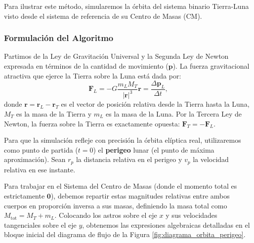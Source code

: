 \documentclass[11pt,a4paper]{book}
\begin{document}
Para ilustrar este método, simularemos la órbita del sistema binario Tierra-Luna visto desde el sistema de referencia de su Centro de Masas (CM).

\subsubsection{Formulación del Algoritmo}


Partimos de la Ley de Gravitación Universal y la Segunda Ley de Newton expresada en términos de la cantidad de movimiento ($\boldsymbol{p}$). La fuerza gravitacional atractiva que ejerce la Tierra sobre la Luna está dada por:
\begin{equation}
    \boldsymbol{F}_L = -G\frac{m_L M_T}{|\boldsymbol{r}|^3}\boldsymbol{r} = \frac{\Delta \boldsymbol{p}_L}{\Delta t},
    \label{eq:fuerza_num}
\end{equation}
donde $\boldsymbol{r} = \boldsymbol{r}_L - \boldsymbol{r}_T$ es el vector de posición relativa desde la Tierra hasta la Luna, $M_T$ es la masa de la Tierra y $m_L$ es la masa de la Luna. Por la Tercera Ley de Newton, la fuerza sobre la Tierra es exactamente opuesta: $\boldsymbol{F}_T = -\boldsymbol{F}_L$.

Para que la simulación refleje con precisión la órbita elíptica real, utilizaremos como punto de partida ($t=0$) el \textbf{perigeo} lunar (el punto de máxima aproximación). Sean $r_p$ la distancia relativa en el perigeo y $v_p$ la velocidad relativa en ese instante. 

Para trabajar en el Sistema del Centro de Masas (donde el momento total es estrictamente $\boldsymbol{0}$), debemos repartir estas magnitudes relativas entre ambos cuerpos en proporción inversa a sus masas, definiendo la masa total como $M_{\text{tot}} = M_T + m_L$. Colocando los astros sobre el eje $x$ y sus velocidades tangenciales sobre el eje $y$, obtenemos las expresiones algebraicas detalladas en el bloque inicial del diagrama de flujo de la Figura \ref{fig:diagrama_orbita_perigeo}.
\end{document}
